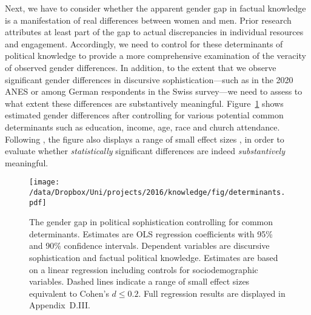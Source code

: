 Next, we have to consider whether the apparent gender gap in factual knowledge is a manifestation of real differences between women and men. Prior research attributes at least part of the gap to actual discrepancies in individual resources and engagement. Accordingly, we need to control for these determinants of political knowledge to provide a more comprehensive examination of the veracity of observed gender differences. In addition, to the extent that we observe significant gender differences in discursive sophistication---such as in the 2020 ANES or among German respondents in the Swiss survey---we need to assess to what extent these differences are substantively meaningful. Figure~\ref{fig:determinants} shows estimated gender differences after controlling for various potential common determinants such as education, income, age, race and church attendance. Following \citet{rainey2014arguing}, the figure also displays a range of small effect sizes \citep[equivalent to Cohen's $d \leq 0.2$; see][]{sawilowsky2009new}, in order to evaluate whether \textit{statistically} significant differences are indeed \textit{substantively} meaningful.

\begin{figure}[h]\centering
\texttt{[image: /data/Dropbox/Uni/projects/2016/knowledge/fig/determinants.pdf]}
\caption[The gender gap in political sophistication after controlling for common determinants.]{The gender gap in political sophistication controlling for common determinants. Estimates are OLS regression coefficients with 95\% and 90\% confidence intervals. Dependent variables are discursive sophistication and factual political knowledge. Estimates are based on a linear regression including controls for sociodemographic variables. Dashed lines indicate a range of small effect sizes equivalent to Cohen's $d \leq 0.2$. Full regression results are displayed in Appendix~D.III.}\label{fig:determinants}
\end{figure}


